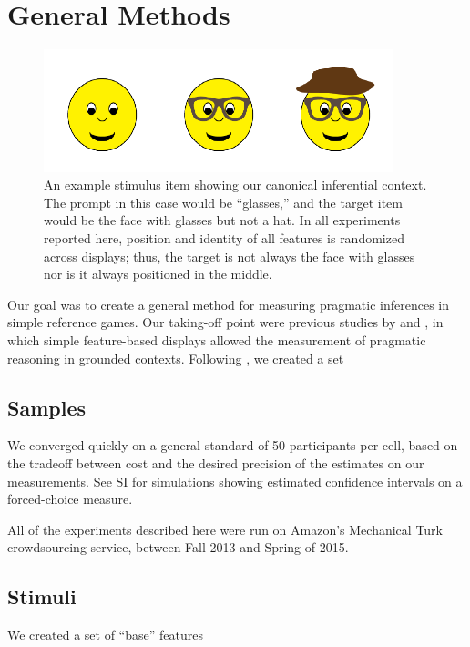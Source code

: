 
\section{General Methods}

\begin{figure}[t]
  \centering
  \includegraphics[width=4in]{figures/hatglasses.pdf}
  \caption{\label{fig:hg} An example stimulus item showing our canonical inferential context. The prompt in this case would be ``glasses,'' and the target item would be the face with glasses but not a hat. In all experiments reported here, position and identity of all features is randomized across displays; thus, the target is not always the face with glasses nor is it always positioned in the middle.}
\end{figure}

Our goal was to create a general method for measuring pragmatic inferences in simple reference games. Our taking-off point were previous studies by  and , in which simple feature-based displays allowed the measurement of pragmatic reasoning in grounded contexts. Following , we created a set


\subsection{Samples}

We converged quickly on a general standard of 50 participants per cell, based on the tradeoff between cost and the desired precision of the estimates on our measurements. See SI for simulations showing estimated confidence intervals on a forced-choice measure. 

All of the experiments described here were run on Amazon's Mechanical Turk crowdsourcing service, between Fall 2013 and Spring of 2015. 

\subsection{Stimuli}

We created a set of ``base'' features

